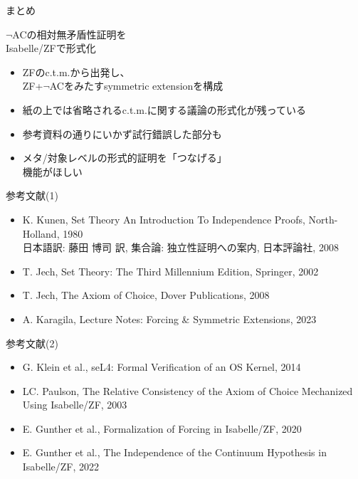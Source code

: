\documentclass[17pt]{beamer}
\begin{document}
\begin{frame}{まとめ}
    \vspace{-3pt}
    \begin{center}
        $\neg$ACの相対無矛盾性証明を\\
        Isabelle/ZFで形式化
    \end{center}
    \vspace{-3pt}
    {\small
    \begin{itemize}[itemsep=4pt]
        \item ZFのc.t.m.から出発し、\\ZF+$\neg$ACをみたすsymmetric extensionを構成
        \item 紙の上では省略されるc.t.m.に関する議論の形式化が残っている
        \item 参考資料の通りにいかず試行錯誤した部分も
        \item メタ/対象レベルの形式的証明を「つなげる」\\機能がほしい
    \end{itemize}
    }
\end{frame}

\appendix
{}
 
\begin{frame}{参考文献(1)}
    \vspace{-30pt}
    \, {\footnotesize 
    \begin{itemize}[itemsep=5pt, left=0pt]
        \item K. Kunen, Set Theory An Introduction To Independence Proofs, North-Holland, 1980 \\
              日本語訳: 藤田 博司 訳, 集合論: 独立性証明への案内, 日本評論社, 2008
        \item T. Jech, Set Theory: The Third Millennium Edition, Springer, 2002
        \item T. Jech, The Axiom of Choice, Dover Publications, 2008
        \item A. Karagila, Lecture Notes: Forcing \& Symmetric Extensions, 2023
    \end{itemize}
    }

\end{frame}

\begin{frame}{参考文献(2)}
    \vspace{-30pt}
    \, {\footnotesize 
    \begin{itemize}[itemsep=5pt, left=0pt]
        \item G. Klein et al., seL4: Formal Verification of an OS Kernel, 2014
        \item LC. Paulson, The Relative Consistency of the Axiom of Choice Mechanized Using Isabelle/ZF, 2003
        \item E. Gunther et al., Formalization of Forcing in Isabelle/ZF, 2020
        \item E. Gunther et al., The Independence of the Continuum Hypothesis in Isabelle/ZF, 2022
    \end{itemize}
    }

\end{frame}
\end{document}
